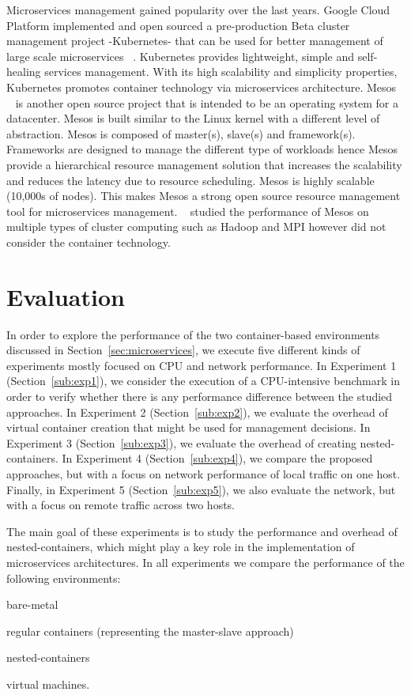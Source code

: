 \documentclass[conference]{IEEEtran}
\begin{document}
Microservices management gained popularity over the last years. Google Cloud Platform implemented and open sourced a pre-production Beta cluster management project -Kubernetes- that can be used for better management of large scale microservices ~\cite{kubernetes}. Kubernetes provides lightweight, simple and self-healing services management. With its high scalability and simplicity properties, Kubernetes promotes container technology via microservices architecture. Mesos ~\cite{mesosWeb} is another open source project that is intended to be an operating system for a datacenter. Mesos is built similar to the Linux kernel with a different level of abstraction. Mesos is composed of master(s), slave(s) and framework(s). Frameworks are designed to manage the different type of workloads hence Mesos provide a hierarchical resource management solution that increases the scalability and reduces the latency due to resource scheduling. Mesos is highly scalable (10,000s of nodes). This makes Mesos a strong open source resource management tool for microservices management. ~\cite{mesos} studied the performance of Mesos on multiple types of cluster computing such as Hadoop and MPI however did not consider the container technology. 


\section{Evaluation}
\label{sec:evaluation}

In order to explore the performance of the two container-based environments
discussed in Section~\ref{sec:microservices}, we execute five different kinds
of experiments mostly focused on CPU and network performance. In Experiment 1
(Section~\ref{sub:exp1}), we consider the execution of a CPU-intensive
benchmark in order to verify whether there is any performance difference between
the studied approaches. In Experiment 2 (Section~\ref{sub:exp2}), we evaluate
the overhead of virtual container creation that might be used for management
decisions. In Experiment 3 (Section~\ref{sub:exp3}), we evaluate the overhead
of creating nested-containers. In Experiment 4 (Section~\ref{sub:exp4}), we compare the proposed approaches, but with a focus on network performance
of local traffic on one host. Finally, in Experiment 5
(Section~\ref{sub:exp5}), we also evaluate the network, but with a focus on
remote traffic across two hosts.

The main goal of these experiments is to study the performance and overhead of
nested-containers, which might play a key role in the implementation of
microservices architectures. In all experiments we compare the performance of
the following environments:
\begin{inparaenum}
 \item bare-metal
 \item regular containers (representing the master-slave approach)
 \item nested-containers
 \item virtual machines.
\end{inparaenum}
\end{document}
